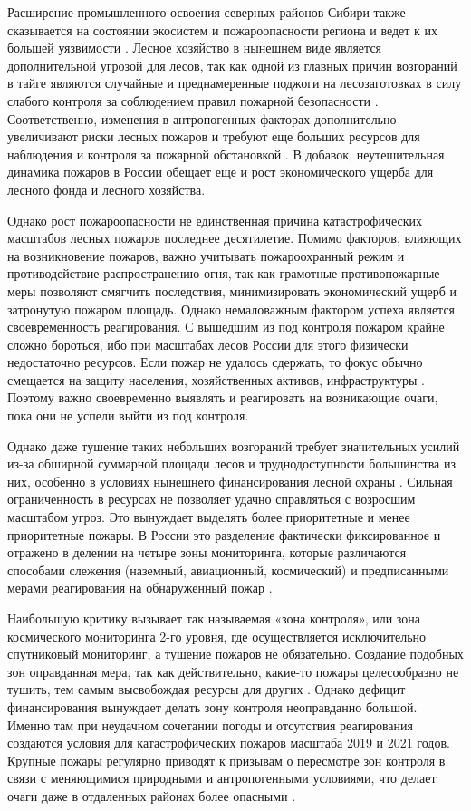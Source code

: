 \documentclass[a4paper,article,14pt]{extarticle}
\begin{document}
Расширение промышленного освоения северных районов Сибири также сказывается на состоянии экосистем и пожароопасности региона и ведет к их большей уязвимости \cite{ShvidenkoClimateChangeWildfires2013}. Лесное хозяйство в нынешнем виде является дополнительной угрозой для лесов, так как одной из главных причин возгораний в тайге являются случайные и преднамеренные поджоги на лесозаготовках в силу слабого контроля за соблюдением правил пожарной безопасности \cite{GrinpisPoluchilPervye2021}. Соответственно, изменения в антропогенных факторах дополнительно увеличивают риски лесных пожаров и требуют еще больших ресурсов для наблюдения и контроля за пожарной обстановкой \cite{ShvidenkoClimateChangeWildfires2013}. В добавок, неутешительная динамика пожаров в России обещает еще и рост экономического ущерба для лесного фонда и лесного хозяйства.

Однако рост пожароопасности не единственная причина катастрофических масштабов лесных пожаров последнее десятилетие. Помимо факторов, влияющих на возникновение пожаров, важно учитывать пожароохранный режим и противодействие распространению огня, так как грамотные противопожарные меры позволяют смягчить последствия, минимизировать экономический ущерб и затронутую пожаром площадь. Однако немаловажным фактором успеха является своевременность реагирования. С вышедшим из под контроля пожаром крайне сложно бороться, ибо при масштабах лесов России для этого физически недостаточно ресурсов. Если пожар не удалось сдержать, то фокус обычно смещается на защиту населения, хозяйственных активов, инфраструктуры \cite{AlekseyYaroshenkoVazhno2019}. Поэтому важно своевременно выявлять и реагировать на возникающие очаги, пока они не успели выйти из под контроля.

Однако даже тушение таких небольших возгораний требует значительных усилий из-за обширной суммарной площади лесов и труднодоступности большинства из них, особенно в условиях нынешнего финансирования лесной охраны \cite{GreenpeacePravitelstvuNuzhno2021}. Сильная ограниченность в ресурсах не позволяет удачно справляться с возросшим масштабом угроз. Это вынуждает выделять более приоритетные и менее приоритетные пожары. В России это разделение фактически фиксированное и отражено в делении на четыре зоны мониторинга, которые различаются способами слежения (наземный, авиационный, космический) и предписанными мерами реагирования на обнаруженный пожар \cite{InformacionnayaSistemaDistancionnogo2008}.

Наибольшую критику вызывает так называемая «зона контроля», или зона космического мониторинга 2-го уровня, где осуществляется исключительно спутниковый мониторинг, а тушение пожаров не обязательно. Создание подобных зон оправданная мера, так как действительно, какие-то пожары целесообразно не тушить, тем самым высвобождая ресурсы для других \cite{KtoKontroliruetPozhary2019}. Однако дефицит финансирования вынуждает делать зону контроля неоправданно большой. Именно там при неудачном сочетании погоды и отсутствия реагирования создаются условия для катастрофических пожаров масштаба 2019 и 2021 годов. Крупные пожары регулярно приводят к призывам о пересмотре зон контроля в связи с меняющимися природными и антропогенными условиями, что делает очаги даже в отдаленных районах более опасными \cite{ZonKontrolyaStanet2022}.
\end{document}
